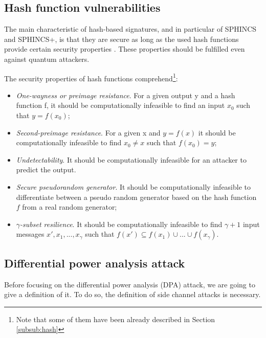 \documentclass[a4paper,12pt]{article}
\begin{document}
\subsection{Hash function vulnerabilities}

The main characteristic of hash-based signatures, and in particular of SPHINCS and SPHINCS+, is that they are secure as long as the used hash functions provide certain security properties \cite{1_sphincspaper}.
These properties should be fulfilled even against quantum attackers.

The security properties of hash functions comprehend\footnote{Note that some of them have been already described in Section \ref{subsub:hash}}:
\begin{itemize}
    \item \textit{One-wayness or preimage resistance}. For a given output y and a hash function f, it should be computationally infeasible to find an input $x_0$ such that $y = f(x_{0})$;
    \item \textit{Second-preimage resistance}. For a given x and $y = f(x)$ it should be computationally infeasible to find $x_0 \neq x$ such that $f(x_{0}) = y$;
    \item \textit{Undetectability}. It should be computationally infeasible for an attacker to predict the output.
    \item \textit{Secure pseudorandom generator}. It should be computationally infeasible to differentiate between a pseudo random generator based on the hash function $f$ from a real random generator;
    \item \textit{$\gamma$-subset resilience}. It should be computationally infeasible to find $\gamma +1$ input messages $x', x_{1},...,x_{\gamma}$ such that $f(x') \subseteq f(x_{1})\cup...\cup f(x_{\gamma})$.
\end{itemize}


\subsection{Differential power analysis attack}

Before focusing on the differential power analysis (DPA) attack, we are going to give a definition of it. To do so, the definition of side channel attacks is necessary. 
\end{document}
